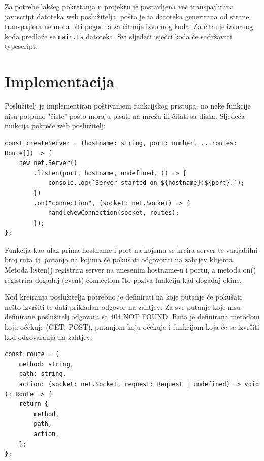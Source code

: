 \documentclass[]{foi}
\begin{document}
Za potrebe lakšeg pokretanja u projektu je postavljena već transpajlirana javascript datoteka
web poslužitelja, pošto je ta datoteka generirana od strane transpajlera ne
mora biti pogodna za čitanje izvornog koda. Za čitanje izvornog koda predlaže se
\texttt{main.ts} datoteka. Svi sljedeći isječci koda će sadržavati typescript.

\section{Implementacija}

Poslužitelj je implementiran poštivanjem funkcijskog pristupa, no neke funkcije nisu
potpuno "čiste" pošto moraju pisati na mrežu ili čitati sa diska. Sljedeća funkcija
pokreće web poslužitelj:
\begin{lstlisting}[caption={Funkcija za pokretanje web poslužitelja}, label=lst:pokretanje]
const createServer = (hostname: string, port: number, ...routes: Route[]) => {
    new net.Server()
        .listen(port, hostname, undefined, () => {
            console.log(`Server started on ${hostname}:${port}.`);
        })
        .on("connection", (socket: net.Socket) => {
            handleNewConnection(socket, routes);
        });
};
\end{lstlisting}
Funkcija kao ulaz prima hostname i port na kojemu se kreira server te varijabilni broj
ruta tj. putanja na kojima će pokušati odgovoriti na zahtjev klijenta. Metoda listen()
registrira server na unesenim hostname-u i portu, a metoda on() registrira događaj (event)
connection što poziva funkciju kad događaj okine.

Kod kreiranja poslužitelja potrebno je definirati na koje putanje će pokušati nešto izvršiti
te dati prikladan odgovor na zahtjev. Za sve putanje koje nisu definirane poslužitelj odgovara
sa 404 NOT FOUND. Ruta je definirana metodom koju očekuje (GET, POST), putanjom koju očekuje
i funkcijom koja će se izvršiti kod odgovaranja na zahtjev.
\begin{lstlisting}[caption={Definicija rute}, label=lst:ruta]
const route = (
    method: string,
    path: string,
    action: (socket: net.Socket, request: Request | undefined) => void
): Route => {
    return {
        method,
        path,
        action,
    };
};
\end{lstlisting}
\end{document}
